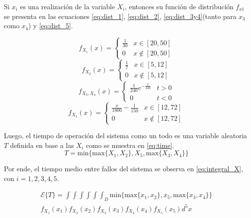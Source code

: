 \documentclass{sig-alternate}
\begin{document}
Si $x_i$ es una realizaci\'on de la variable $X_i$, entonces su funci\'on de distribuci\'on $f_{x1}$
se presenta en las ecuaciones \eqref{eq:dist_1}, \eqref{eq:dist_2},
\eqref{eq:dist_3y4}(tanto para $x_3$ como $x_4$) y \eqref{eq:dist_5}.

\begin{equation}
\label{eq:dist_1}
f_{X_1}(x) =
\begin{cases}
\frac{1}{30} & x \in [20,50] \\
0 & x \notin [20, 50]
\end{cases}
\end{equation}
\begin{equation}
\label{eq:dist_2}
f_{X_2}(x) =
\begin{cases}
\frac{1}{7} & x \in [5,12] \\
0 & x \notin [5,12]
\end{cases}
\end{equation}
\begin{equation}
\label{eq:dist_3y4}
f_{X_3, X_4}(x) =
  \begin{cases}
    \frac{1}{240} e^{-\frac{t}{240}} & t > 0 \\
    0 & t < 0
  \end{cases}
\end{equation}
\begin{equation}
\label{eq:dist_5}
f_{X_5}(x) =
\begin{cases}
\frac{x}{1800} - \frac{1}{150} & x \in [12,72] \\
0 & x \notin [12,72]
\end{cases}
\end{equation}

Luego, el tiempo de operaci\'on del sistema como un todo es una variable
aleatoria $T$ definida en base a las $X_i$ como se muestra en \eqref{eq:time}.
\begin{equation}
\label{eq:time}
T = \mathrm{min} \{ \mathrm{max} \{ X_1 , X_2 \}, X_5 , \mathrm{max} \{ X_3 , X_4 \} \}
\end{equation}

Por ende, el tiempo medio entre fallos del sistema se observa en \eqref{eq:integral_X},
con $i=1,2,3,4,5$.

\begin{eqnarray}
\label{eq:integral_X}
\mathcal{E} \{ T \} = \int\int\int\int\int\int_D \mathrm{min} 
\{ \mathrm{max} \{ x_1 , x_2 \}, x_5, \mathrm{max} \{ x_3 , x_4 \} \}
\nonumber
\\
f_{X_1}(x_1) f_{X_2}(x_2) f_{X_3}(x_3) f_{X_4}(x_4) f_{X_5}(x_5) d^5{x}
\end{eqnarray}
\end{document}
